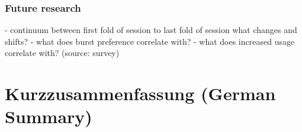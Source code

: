 \documentclass[12pt,a4paper]{report}
\begin{document}
\subsection{Future research}
- continuum between first fold of session to last fold of session what changes and shifts?
- what does burst preference correlate with?
- what does increased usage correlate with? (source: survey)
\fi

\printbibliography[heading=thesisbib,title={Bibliography}]

\appendix
\chapter{Kurzzusammenfassung (German Summary)}
\label{app:german_summary}
\end{document}
